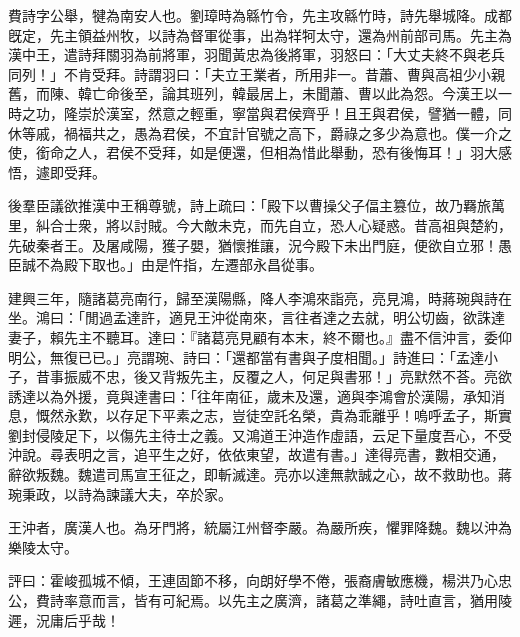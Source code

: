\begin{pinyinscope}
 
 
 費詩字公舉，犍為南安人也。劉璋時為緜竹令，先主攻緜竹時，詩先舉城降。成都旣定，先主領益州牧，以詩為督軍從事，出為䍧牱太守，還為州前部司馬。先主為漢中王，遣詩拜關羽為前將軍，羽聞黃忠為後將軍，羽怒曰：「大丈夫終不與老兵同列！」不肯受拜。詩謂羽曰：「夫立王業者，所用非一。昔蕭、曹與高祖少小親舊，而陳、韓亡命後至，論其班列，韓最居上，未聞蕭、曹以此為怨。今漢王以一時之功，隆崇於漢室，然意之輕重，寧當與君侯齊乎！且王與君侯，譬猶一體，同休等戚，禍福共之，愚為君侯，不宜計官號之高下，爵祿之多少為意也。僕一介之使，銜命之人，君侯不受拜，如是便還，但相為惜此舉動，恐有後悔耳！」羽大感悟，遽即受拜。
 
 
 
 
 後羣臣議欲推漢中王稱尊號，詩上疏曰：「殿下以曹操父子偪主篡位，故乃羇旅萬里，糾合士衆，將以討賊。今大敵未克，而先自立，恐人心疑惑。昔高祖與楚約，先破秦者王。及屠咸陽，獲子嬰，猶懷推讓，況今殿下未出門庭，便欲自立邪！愚臣誠不為殿下取也。」由是忤指，左遷部永昌從事。
 
 
 建興三年，隨諸葛亮南行，歸至漢陽縣，降人李鴻來詣亮，亮見鴻，時蔣琬與詩在坐。鴻曰：「閒過孟達許，適見王沖從南來，言往者達之去就，明公切齒，欲誅達妻子，賴先主不聽耳。達曰：『諸葛亮見顧有本末，終不爾也。』盡不信沖言，委仰明公，無復已已。」亮謂琬、詩曰：「還都當有書與子度相聞。」詩進曰：「孟達小子，昔事振威不忠，後又背叛先主，反覆之人，何足與書邪！」亮默然不荅。亮欲誘達以為外援，竟與達書曰：「往年南征，歲未及還，適與李鴻會於漢陽，承知消息，慨然永歎，以存足下平素之志，豈徒空託名榮，貴為乖離乎！嗚呼孟子，斯實劉封侵陵足下，以傷先主待士之義。又鴻道王沖造作虛語，云足下量度吾心，不受沖說。尋表明之言，追平生之好，依依東望，故遣有書。」達得亮書，數相交通，辭欲叛魏。魏遣司馬宣王征之，即斬滅達。亮亦以達無款誠之心，故不救助也。蔣琬秉政，以詩為諫議大夫，卒於家。
 
 
王沖者，廣漢人也。為牙門將，統屬江州督李嚴。為嚴所疾，懼罪降魏。魏以沖為樂陵太守。
 
 
 
 
 評曰：霍峻孤城不傾，王連固節不移，向朗好學不倦，張裔膚敏應機，楊洪乃心忠公，費詩率意而言，皆有可紀焉。以先主之廣濟，諸葛之準繩，詩吐直言，猶用陵遲，況庸后乎哉！
 
 
\end{pinyinscope}